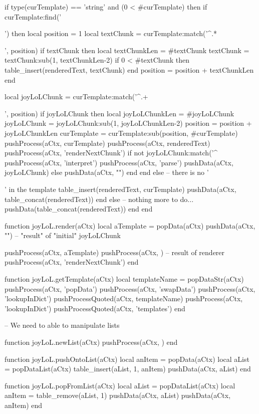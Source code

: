   if type(curTemplate) == 'string' and (0 < #curTemplate) then
    if curTemplate:find('{{') then
      local position  = 1
      local textChunk = curTemplate:match('^.*{{', position)
      if textChunk then 
        local textChunkLen = #textChunk
        textChunk = textChunk:sub(1, textChunkLen-2)
        if 0 < #textChunk then table_insert(renderedText, textChunk) end
        position = position + textChunkLen
      end
      
      local joyLoLChunk = curTemplate:match('^.+}}', position)
      if joyLoLChunk then
        local joyLoLChunkLen = #joyLoLChunk
        joyLoLChunk = joyLoLChunk:sub(1, joyLoLChunkLen-2)
        position = position + joyLoLChunkLen
        curTemplate = curTemplate:sub(position, #curTemplate)
        pushProcess(aCtx, curTemplate)
        pushProcess(aCtx, renderedText)
        pushProcess(aCtx, 'renderNextChunk')
        if not joyLoLChunk:match('^%
          pushProcess(aCtx, 'interpret')
          pushProcess(aCtx, 'parse')
          pushData(aCtx, joyLoLChunk)
        else
          pushData(aCtx, "")
        end
      end
    else -- there is no '{{' in the template
      table_insert(renderedText, curTemplate)
      pushData(aCtx, table_concat(renderedText))
    end
  else
    -- nothing more to do...
    pushData(table_concat(renderedText))
  end
end

function joyLoL.render(aCtx)
  local aTemplate = popData(aCtx)
  pushData(aCtx, "")    -- "result" of "initial" joyLoLChunk

  pushProcess(aCtx, aTemplate)
  pushProcess(aCtx, {}) -- result of renderer
  pushProcess(aCtx, 'renderNextChunk')
end

function joyLoL.getTemplate(aCtx)
  local templateName = popDataStr(aCtx)
  pushProcess(aCtx, 'popData')
  pushProcess(aCtx, 'swapData')
  pushProcess(aCtx, 'lookupInDict')
  pushProcessQuoted(aCtx, templateName)
  pushProcess(aCtx, 'lookupInDict')
  pushProcessQuoted(aCtx, 'templates')
end

-- We need to able to manipulate lists

function joyLoL.newList(aCtx)
  pushProcess(aCtx, {})
end

function joyLoL.pushOntoList(aCtx)
  local anItem = popData(aCtx)
  local aList  = popDataList(aCtx)
  table_insert(aList, 1, anItem)
  pushData(aCtx, aList)
end

function joyLoL.popFromList(aCtx)
  local aList = popDataList(aCtx)
  local anItem = table_remove(aList, 1)
  pushData(aCtx, aList)
  pushData(aCtx, anItem)
end

}}}}
